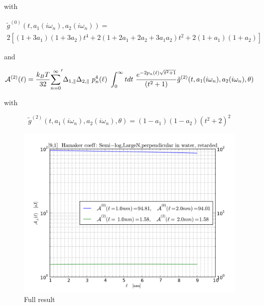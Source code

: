\documentclass[a4paper]{article}
\begin{document}
\begin{center}
with

\begin{multline*}
\tilde g^{(0)}(t, a_1(i \omega_n), a_2(i \omega_n)) = \\ 
2 \left[ (1+3a_1)(1+3a_2) t^{4} + 2 (1+2a_1+2a_2+3a_1a_2) t^{2}  + 2(1+a_1)(1+a_2)\right]
\end{multline*}


and

\begin{equation}
{\cal A}^{(2)}(\ell) = \frac{k_BT}{32}  {\sum_{n=0}^{\infty}}' \Delta_{1,\parallel} \Delta_{2,\parallel} ~p_n^{4}(\ell) ~\int_0^{\infty} t dt ~\frac{e^{- 2 p_n(\ell) \sqrt{t^{2} + 1}}}{(t^{2} + 1)} \tilde g^{(2)}(t, a_1(i \omega_n), a_2(i \omega_n), \theta)
\end{equation}

with

\begin{equation}
\tilde g^{(2)}(t, a_1(i \omega_n), a_2(i \omega_n), \theta) = (1-a_1)(1-a_2)(t^{2} + 2)^2
\label{befgqw}
\end{equation}

\begin{figure}[t!]
\begin{center}
\includegraphics[width=1.2\textwidth]{large_N/140322_91w91_semilog_HCs_perpendicular_ret_lrg_n.png}
\hskip 43pt
\caption{Full result}
\label{eiz65}
\end{center}
\end{figure} 


\end{center}
\end{document}
